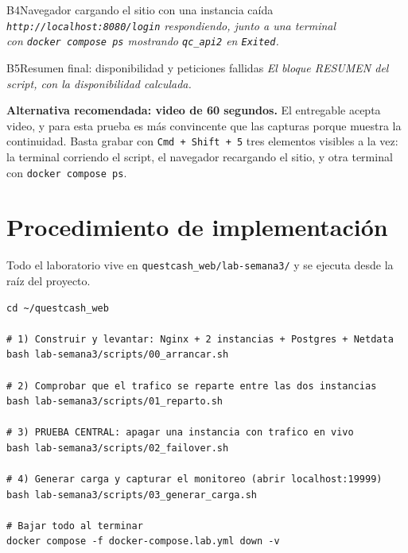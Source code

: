 \documentclass[11pt,letterpaper]{article}
\begin{document}
\vspace{0.6em}
\begin{captura}{B4}{Navegador cargando el sitio con una instancia caída}
\vspace{2.4cm}
\centering\itshape\color{qcGray}\footnotesize
\texttt{http://localhost:8080/login} respondiendo, junto a una terminal\\
con \texttt{docker compose ps} mostrando \texttt{qc\_api2} en \texttt{Exited}.
\vspace{2.2cm}
\end{captura}

\vspace{0.6em}
\begin{captura}{B5}{Resumen final: disponibilidad y peticiones fallidas}
\vspace{2.2cm}
\centering\itshape\color{qcGray}\footnotesize
El bloque RESUMEN del script, con la disponibilidad calculada.
\vspace{2.0cm}
\end{captura}

\begin{nota}
\textbf{Alternativa recomendada: video de 60 segundos.} El entregable acepta
video, y para esta prueba es más convincente que las capturas porque muestra la
continuidad. Basta grabar con \texttt{Cmd + Shift + 5} tres elementos visibles a
la vez: la terminal corriendo el script, el navegador recargando el sitio, y otra
terminal con \texttt{docker compose ps}.
\end{nota}

\section{Procedimiento de implementación}

Todo el laboratorio vive en \texttt{questcash\_web/lab-semana3/} y se ejecuta
desde la raíz del proyecto.

\begin{consola}[title={Levantar el laboratorio y correr las pruebas}]
\begin{lstlisting}[style=terminal]
cd ~/questcash_web

# 1) Construir y levantar: Nginx + 2 instancias + Postgres + Netdata
bash lab-semana3/scripts/00_arrancar.sh

# 2) Comprobar que el trafico se reparte entre las dos instancias
bash lab-semana3/scripts/01_reparto.sh

# 3) PRUEBA CENTRAL: apagar una instancia con trafico en vivo
bash lab-semana3/scripts/02_failover.sh

# 4) Generar carga y capturar el monitoreo (abrir localhost:19999)
bash lab-semana3/scripts/03_generar_carga.sh

# Bajar todo al terminar
docker compose -f docker-compose.lab.yml down -v
\end{lstlisting}
\end{consola}
\end{document}
